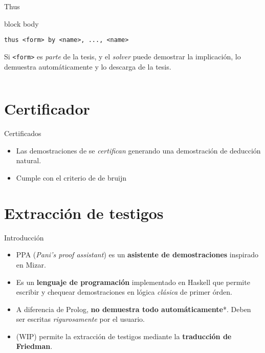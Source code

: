 \documentclass[xcolor={dvipsnames},spanish]{beamer}
\newenvironment{command}
    {
        \begin{beamercolorbox}[sep=8pt,center,shadow=true,rounded=true]{block body}
    }
    {\end{beamercolorbox}}
\begin{document}
\begin{frame}[fragile]{Thus}
    \begin{command}
    \lstinline{thus <form> by <name>, ..., <name>}
    \end{command}

    Si \lstinline{<form>} es \textit{parte} de la tesis, y el \textit{solver} puede demostrar la implicación, lo demuestra automáticamente y lo descarga de la tesis.
    \begin{columns}
        \begin{column}{0.5\textwidth}
            
        \end{column}
        \begin{column}{0.5\textwidth}
            
        \end{column}
    \end{columns}
\end{frame}

\section{Certificador}

\begin{frame}{Certificados}
    \begin{itemize}
        \item Las demostraciones de \ppaLang se \textit{certifican} generando
        una demostración de deducción natural.
        \item Cumple con el criterio de de bruijn 
    \end{itemize}
    
\end{frame}

\section{Extracción de testigos}



\begin{frame}{Introducción}
    \begin{itemize}
        \item PPA (\textit{Pani's proof assistant}) es un \textbf{asistente de demostraciones} inspirado en Mizar.
        \item Es un \textbf{lenguaje de programación} implementado en Haskell que permite escribir y chequear demostraciones en lógica \textit{clásica} de primer órden.
        \item A diferencia de Prolog, \textbf{no demuestra todo automáticamente}*. Deben ser escritas \textit{rigurosamente} por el usuario.
        \item (WIP) permite la extracción de testigos mediante la \textbf{traducción de Friedman}.
    \end{itemize}
\end{frame}
\end{document}
